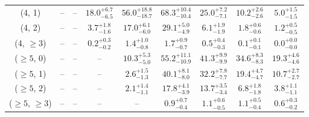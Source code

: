 \begin{table}[h!]
{\begin{tabular}{ccccccccc}
	(4, 1) & -- & -- & $18.0^{+ 6.7 }_{- 6.5 }$ & $56.0^{+ 18.8 }_{- 18.7 }$ & $68.3^{+ 10.4 }_{- 10.4 }$ & $25.0^{+ 7.2 }_{- 7.1 }$ & $10.2^{+ 2.6 }_{- 2.6 }$ & $5.0^{+ 1.5 }_{- 1.5 }$ \\[0.5ex] 
	(4, 2) & -- & -- & $3.7^{+ 1.8 }_{- 1.6 }$ & $17.0^{+ 6.1 }_{- 6.0 }$ & $29.1^{+ 5.0 }_{- 4.9 }$ & $6.1^{+ 1.9 }_{- 1.9 }$ & $1.8^{+ 0.6 }_{- 0.6 }$ & $1.2^{+ 0.5 }_{- 0.5 }$ \\[0.5ex] 
	(4, $\ge3$) & -- & -- & $0.2^{+ 0.3 }_{- 0.2 }$ & $1.4^{+ 1.0 }_{- 0.8 }$ & $1.7^{+ 0.9 }_{- 0.7 }$ & $0.5^{+ 0.4 }_{- 0.3 }$ & $0.1^{+ 0.1 }_{- 0.1 }$ & $0.0^{+ 0.0 }_{- 0.0 }$ \\[0.5ex] 
	($\ge5$, 0) & -- & -- & -- & $10.3^{+ 5.3 }_{- 5.0 }$ & $55.2^{+ 11.1 }_{- 10.9 }$ & $41.3^{+ 9.9 }_{- 9.9 }$ & $34.6^{+ 8.3 }_{- 8.3 }$ & $19.3^{+ 4.6 }_{- 4.6 }$ \\[0.5ex] 
	($\ge5$, 1) & -- & -- & -- & $2.6^{+ 1.5 }_{- 1.3 }$ & $40.1^{+ 8.1 }_{- 8.0 }$ & $32.2^{+ 7.8 }_{- 7.7 }$ & $19.4^{+ 4.7 }_{- 4.7 }$ & $10.7^{+ 2.7 }_{- 2.7 }$ \\[0.5ex] 
	($\ge5$, 2) & -- & -- & -- & $2.1^{+ 1.4 }_{- 1.1 }$ & $17.8^{+ 4.1 }_{- 3.9 }$ & $13.7^{+ 3.5 }_{- 3.4 }$ & $6.8^{+ 1.8 }_{- 1.8 }$ & $3.8^{+ 1.1 }_{- 1.1 }$ \\[0.5ex] 
	($\ge5$, $\ge3$) & -- & -- & -- & -- & $0.9^{+ 0.7 }_{- 0.4 }$ & $1.1^{+ 0.6 }_{- 0.5 }$ & $1.1^{+ 0.5 }_{- 0.4 }$ & $0.6^{+ 0.3 }_{- 0.2 }$ \\[0.5ex] 
	\hline
	\hline
\end{tabular}}
\end{table}
